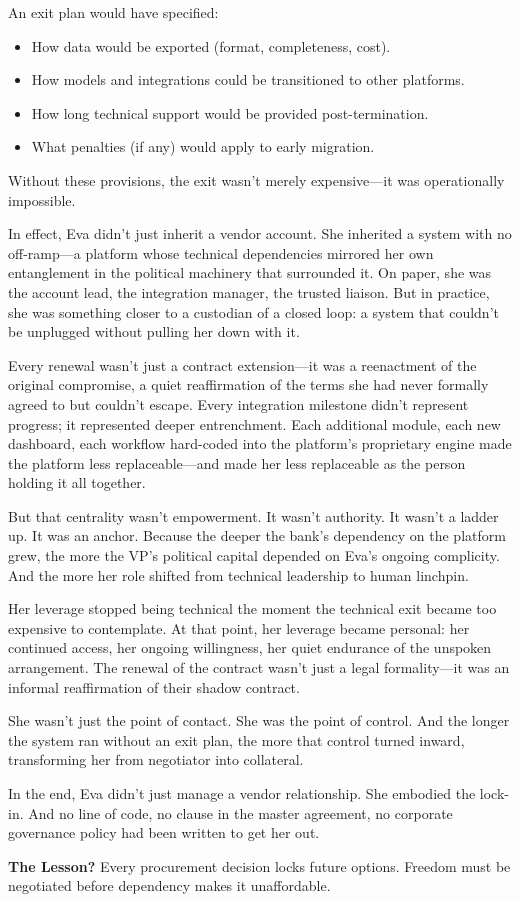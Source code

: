 An exit plan would have specified:  
\begin{itemize}
    \item How data would be exported (format, completeness, cost).
    \item How models and integrations could be transitioned to other platforms.
    \item How long technical support would be provided post-termination.
    \item What penalties (if any) would apply to early migration.
\end{itemize}

Without these provisions, the exit wasn’t merely expensive—it was operationally impossible.  

In effect, Eva didn’t just inherit a vendor account. She inherited a system with no off-ramp—a platform whose technical dependencies mirrored her own entanglement in the political machinery that surrounded it. On paper, she was the account lead, the integration manager, the trusted liaison. But in practice, she was something closer to a custodian of a closed loop: a system that couldn’t be unplugged without pulling her down with it.

Every renewal wasn’t just a contract extension—it was a reenactment of the original compromise, a quiet reaffirmation of the terms she had never formally agreed to but couldn’t escape. Every integration milestone didn’t represent progress; it represented deeper entrenchment. Each additional module, each new dashboard, each workflow hard-coded into the platform’s proprietary engine made the platform less replaceable—and made her less replaceable as the person holding it all together.

But that centrality wasn’t empowerment. It wasn’t authority. It wasn’t a ladder up. It was an anchor. Because the deeper the bank’s dependency on the platform grew, the more the VP’s political capital depended on Eva’s ongoing complicity. And the more her role shifted from technical leadership to human linchpin.

Her leverage stopped being technical the moment the technical exit became too expensive to contemplate. At that point, her leverage became personal: her continued access, her ongoing willingness, her quiet endurance of the unspoken arrangement. The renewal of the contract wasn’t just a legal formality—it was an informal reaffirmation of their shadow contract.

She wasn’t just the point of contact. She was the point of control. And the longer the system ran without an exit plan, the more that control turned inward, transforming her from negotiator into collateral.

In the end, Eva didn’t just manage a vendor relationship. She embodied the lock-in. And no line of code, no clause in the master agreement, no corporate governance policy had been written to get her out.

\medskip

\textbf{The Lesson?} Every procurement decision locks future options. Freedom must be negotiated before dependency makes it unaffordable.
